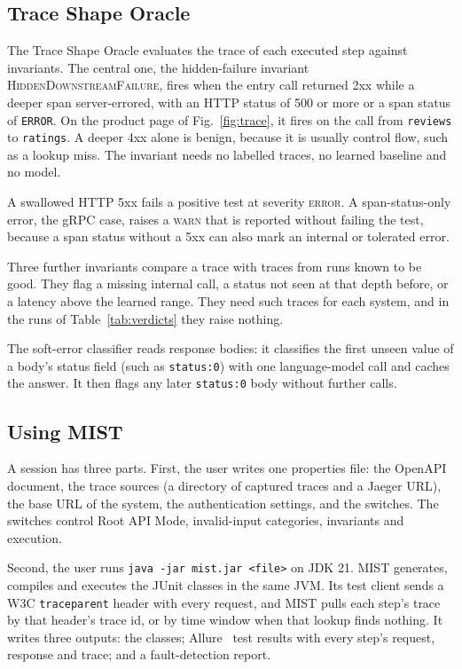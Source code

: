 \documentclass[10pt,conference]{IEEEtran}
\newcommand{\HDF}{\textsc{Hidden\-Downstream\-Failure}}
\begin{document}
\subsection{Trace Shape Oracle}\label{sec:traceoracle}

The Trace Shape Oracle evaluates the trace of each executed step against invariants. The central one, the hidden-failure invariant \HDF{}, fires when the entry call returned 2xx while a deeper span server-errored, with an HTTP status of 500 or more or a span status of \texttt{ERROR}. On the product page of Fig.~\ref{fig:trace}, it fires on the call from \texttt{reviews} to \texttt{ratings}. A deeper 4xx alone is benign, because it is usually control flow, such as a lookup miss. The invariant needs no labelled traces, no learned baseline and no model.

A swallowed HTTP 5xx fails a positive test at severity \textsc{error}. A span-status-only error, the gRPC case, raises a \textsc{warn} that is reported without failing the test, because a span status without a 5xx can also mark an internal or tolerated error.

Three further invariants compare a trace with traces from runs known to be good. They flag a missing internal call, a status not seen at that depth before, or a latency above the learned range. They need such traces for each system, and in the runs of Table~\ref{tab:verdicts} they raise nothing.

The soft-error classifier reads response bodies: it classifies the first unseen value of a body's status field (such as \texttt{status:0}) with one language-model call and caches the answer. It then flags any later \texttt{status:0} body without further calls.

\subsection{Using MIST}\label{sec:usage}

A session has three parts. First, the user writes one properties file: the OpenAPI document, the trace sources (a directory of captured traces and a Jaeger URL), the base URL of the system, the authentication settings, and the switches. The switches control Root API Mode, invalid-input categories, invariants and execution.

Second, the user runs \texttt{java -jar mist.jar <file>} on JDK 21. MIST generates, compiles and executes the JUnit classes in the same JVM. Its test client sends a W3C \texttt{traceparent} header with every request, and MIST pulls each step's trace by that header's trace id, or by time window when that lookup finds nothing. It writes three outputs: the classes; Allure~\cite{AllureReport} test results with every step's request, response and trace; and a fault-detection report.
\end{document}
